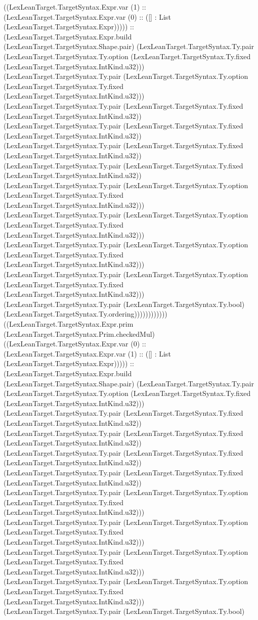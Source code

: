\documentclass[11pt]{article}
\begin{document}
((LexLeanTarget.TargetSyntax.Expr.var (1) :: (LexLeanTarget.TargetSyntax.Expr.var (0) :: ([] : List (LexLeanTarget.TargetSyntax.Expr))))) :: (LexLeanTarget.TargetSyntax.Expr.build (LexLeanTarget.TargetSyntax.Shape.pair) (LexLeanTarget.TargetSyntax.Ty.pair (LexLeanTarget.TargetSyntax.Ty.option (LexLeanTarget.TargetSyntax.Ty.fixed (LexLeanTarget.TargetSyntax.IntKind.u32))) (LexLeanTarget.TargetSyntax.Ty.pair (LexLeanTarget.TargetSyntax.Ty.option (LexLeanTarget.TargetSyntax.Ty.fixed (LexLeanTarget.TargetSyntax.IntKind.u32))) (LexLeanTarget.TargetSyntax.Ty.pair (LexLeanTarget.TargetSyntax.Ty.fixed (LexLeanTarget.TargetSyntax.IntKind.u32)) (LexLeanTarget.TargetSyntax.Ty.pair (LexLeanTarget.TargetSyntax.Ty.fixed (LexLeanTarget.TargetSyntax.IntKind.u32)) (LexLeanTarget.TargetSyntax.Ty.pair (LexLeanTarget.TargetSyntax.Ty.fixed (LexLeanTarget.TargetSyntax.IntKind.u32)) (LexLeanTarget.TargetSyntax.Ty.pair (LexLeanTarget.TargetSyntax.Ty.fixed (LexLeanTarget.TargetSyntax.IntKind.u32)) (LexLeanTarget.TargetSyntax.Ty.pair (LexLeanTarget.TargetSyntax.Ty.option (LexLeanTarget.TargetSyntax.Ty.fixed (LexLeanTarget.TargetSyntax.IntKind.u32))) (LexLeanTarget.TargetSyntax.Ty.pair (LexLeanTarget.TargetSyntax.Ty.option (LexLeanTarget.TargetSyntax.Ty.fixed (LexLeanTarget.TargetSyntax.IntKind.u32))) (LexLeanTarget.TargetSyntax.Ty.pair (LexLeanTarget.TargetSyntax.Ty.option (LexLeanTarget.TargetSyntax.Ty.fixed (LexLeanTarget.TargetSyntax.IntKind.u32))) (LexLeanTarget.TargetSyntax.Ty.pair (LexLeanTarget.TargetSyntax.Ty.option (LexLeanTarget.TargetSyntax.Ty.fixed (LexLeanTarget.TargetSyntax.IntKind.u32))) (LexLeanTarget.TargetSyntax.Ty.pair (LexLeanTarget.TargetSyntax.Ty.bool) (LexLeanTarget.TargetSyntax.Ty.ordering)))))))))))) ((LexLeanTarget.TargetSyntax.Expr.prim (LexLeanTarget.TargetSyntax.Prim.checkedMul) ((LexLeanTarget.TargetSyntax.Expr.var (0) :: (LexLeanTarget.TargetSyntax.Expr.var (1) :: ([] : List (LexLeanTarget.TargetSyntax.Expr))))) :: (LexLeanTarget.TargetSyntax.Expr.build (LexLeanTarget.TargetSyntax.Shape.pair) (LexLeanTarget.TargetSyntax.Ty.pair (LexLeanTarget.TargetSyntax.Ty.option (LexLeanTarget.TargetSyntax.Ty.fixed (LexLeanTarget.TargetSyntax.IntKind.u32))) (LexLeanTarget.TargetSyntax.Ty.pair (LexLeanTarget.TargetSyntax.Ty.fixed (LexLeanTarget.TargetSyntax.IntKind.u32)) (LexLeanTarget.TargetSyntax.Ty.pair (LexLeanTarget.TargetSyntax.Ty.fixed (LexLeanTarget.TargetSyntax.IntKind.u32)) (LexLeanTarget.TargetSyntax.Ty.pair (LexLeanTarget.TargetSyntax.Ty.fixed (LexLeanTarget.TargetSyntax.IntKind.u32)) (LexLeanTarget.TargetSyntax.Ty.pair (LexLeanTarget.TargetSyntax.Ty.fixed (LexLeanTarget.TargetSyntax.IntKind.u32)) (LexLeanTarget.TargetSyntax.Ty.pair (LexLeanTarget.TargetSyntax.Ty.option (LexLeanTarget.TargetSyntax.Ty.fixed (LexLeanTarget.TargetSyntax.IntKind.u32))) (LexLeanTarget.TargetSyntax.Ty.pair (LexLeanTarget.TargetSyntax.Ty.option (LexLeanTarget.TargetSyntax.Ty.fixed (LexLeanTarget.TargetSyntax.IntKind.u32))) (LexLeanTarget.TargetSyntax.Ty.pair (LexLeanTarget.TargetSyntax.Ty.option (LexLeanTarget.TargetSyntax.Ty.fixed (LexLeanTarget.TargetSyntax.IntKind.u32))) (LexLeanTarget.TargetSyntax.Ty.pair (LexLeanTarget.TargetSyntax.Ty.option (LexLeanTarget.TargetSyntax.Ty.fixed (LexLeanTarget.TargetSyntax.IntKind.u32))) (LexLeanTarget.TargetSyntax.Ty.pair (LexLeanTarget.TargetSyntax.Ty.bool) 
\end{document}
